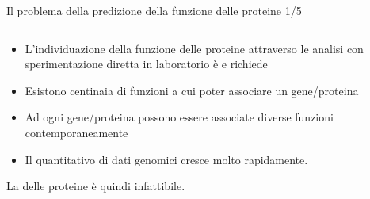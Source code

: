 \documentclass{beamer}
\begin{document}
\begin{tframe}{\small Il problema della predizione della funzione delle proteine 1/5}
  \begin{columns}
    \begin{column}{.75\textwidth}
      \minipage[c][0.4\textheight][s]{\columnwidth}
	   \begin{itemize}	
	  \item L'individuazione della funzione delle proteine attraverso le analisi con sperimentazione diretta in laboratorio è  e richiede 
	  \onslide<2->
	  \item Esistono centinaia di funzioni a cui poter associare un gene/proteina 
	  \onslide<3->
	  \item Ad ogni gene/proteina possono essere associate diverse funzioni contemporaneamente 
	  \item Il quantitativo di dati genomici cresce molto rapidamente.
      \end{itemize}
      La  delle proteine è quindi infattibile.
      \endminipage      
    \end{column}
    \begin{column}{.25\textwidth}



    \end{column}
  \end{columns}

\end{tframe}
\end{document}
